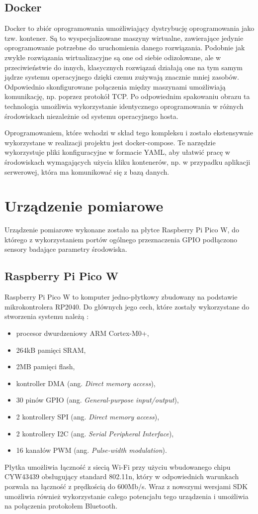 \subsection*{Docker}
Docker to zbiór oprogramowania umożliwiający dystrybucję oprogramowania jako tzw. kontener.
Są to wyspecjalizowane maszyny wirtualne, zawierające jedynie oprogramowanie potrzebne
do uruchomienia danego rozwiązania. Podobnie jak zwykłe rozwiązania wirtualizacyjne
są one od siebie odizolowane, ale w przeciwieństwie do innych, klasycznych rozwiązań
działają one na tym samym jądrze systemu operacyjnego dzięki czemu zużywają znacznie
mniej zasobów\cite{docker:what_is_container}. Odpowiednio skonfigurowane połączenia
między maszynami umożliwiają komunikację, np. poprzez protokół TCP. 
Po odpowiednim spakowaniu obrazu ta technologia umożliwia wykorzystanie identycznego
oprogramowania w różnych środowiskach niezależnie od systemu operacyjnego hosta.

Oprogramowaniem, które wchodzi w skład tego kompleksu i zostało ekstensywnie wykorzystane 
w realizacji projektu jest docker-compose. Te narzędzie wykorzystuje pliki konfiguracyjne
w formacie YAML, aby ułatwić pracę w środowiskach wymagających użycia kliku kontenerów, np.
w przypadku aplikacji serwerowej, która ma komunikować się z bazą danych.

\section{Urządzenie pomiarowe}
Urządzenie pomiarowe wykonane zostało na płytce Raspberry Pi Pico W, do którego z wykorzystaniem
portów ogólnego przeznaczenia GPIO podłączono sensory badające parametry środowiska.

\subsection*{Raspberry Pi Pico W}
Raspberry Pi Pico W to komputer jedno-płytkowy zbudowany na podstawie mikrokontrolera RP2040. 
Do głównych jego cech, które zostały wykorzystane do stworzenia systemu należą \cite{rp2040:datasheet}:
\begin{itemize}
  \item procesor dwurdzeniowy ARM Cortex-M0+,
  \item 264kB pamięci SRAM,
  \item 2MB pamięci flash,
  \item kontroller DMA (ang. \textit{Direct memory access}),
  \item 30 pinów GPIO (ang. \textit{General-purpose input/output}),
  \item 2 kontrollery SPI (ang. \textit{Direct memory access}),
  \item 2 kontrollery I2C (ang. \textit{Serial Peripheral Interface}),
  \item 16 kanałów PWM (ang. \textit{Pulse-width modulation}).
\end{itemize}
Płytka umożliwia łączność z siecią Wi-Fi przy użyciu wbudowanego chipu CYW43439
obsługujący standard 802.11n, który w odpowiednich warunkach pozwala na łączność
z prędkością do 600Mb/s. Wraz z nowszymi wersjami SDK umożliwia również wykorzystanie
całego potencjału tego urządzenia i umożliwia na połączenia protokołem Bluetooth.

